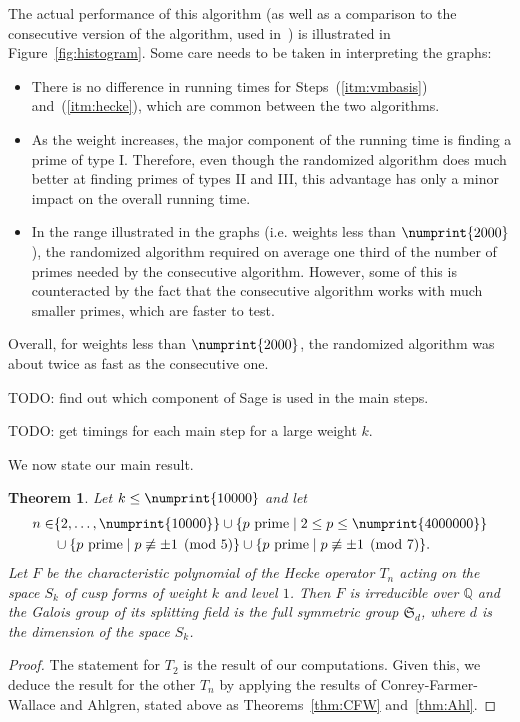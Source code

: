 \documentclass[11pt]{article}
\theoremstyle{plain}
\newtheorem{theorem}{Theorem}[section]
\theoremstyle{definition}
\theoremstyle{remark}
\numberwithin{equation}{section}
\newcommand{\QQ}{\mathbb{Q}}
\renewcommand{\SS}{\mathfrak{S}}
\newcommand{\bound}{\numprint{10000}}
\begin{document}
The actual performance of this algorithm (as well as a comparison to the
consecutive version of the algorithm, used in~\cite{ConreyFarmer}) is
illustrated in Figure~\ref{fig:histogram}.  Some care needs to be taken in
interpreting the graphs:
\begin{itemize}
  \item There is no difference in running times for Steps~(\ref{itm:vmbasis}) 
    and~(\ref{itm:hecke}), which 
    are common between the two algorithms.
  \item As the weight increases, the major component of the running time is
    finding a prime of type I.  Therefore, even though the randomized
    algorithm does much better at finding primes of types II and III, this
    advantage has only a minor impact on the overall running time.
  \item In the range illustrated in the graphs (i.e. weights less than
    $\numprint{2000}$), the randomized algorithm required on average one third
    of the number of primes needed by the consecutive algorithm.  However,
    some of this is counteracted by the fact that the consecutive algorithm
    works with much smaller primes, which are faster to test.
\end{itemize}

Overall, for weights less than $\numprint{2000}$, the randomized algorithm was
about twice as fast as the consecutive one.  

TODO: find out which component of Sage is used in the main steps.

TODO: get timings for each main step for a large weight $k$.



We now state our main result.

\begin{theorem}\label{thm:main}
  Let $k\leq \bound$ and let
  \begin{align*}
    n\in &\{2,\ldots,\numprint{10000}\}\cup
    \{p\text{ prime}\mid 2\leq p\leq\numprint{4000000}\}\\
    &\cup\{p\text{ prime}\mid p\not\equiv\pm 1\pmod{5}\}\cup
    \{p\text{ prime}\mid p\not\equiv\pm 1\pmod{7}\}.
  \end{align*}
  Let $F$ be the characteristic polynomial of the
  Hecke operator $T_n$ acting on the space $S_k$ of cusp forms of weight
  $k$ and level $1$.  Then $F$ is irreducible over $\QQ$ and the Galois
  group of its splitting field is the full symmetric group $\SS_d$, 
  where $d$ is the dimension of the space $S_k$.
\end{theorem}
\begin{proof}
  The statement for $T_2$ is the result of our computations.  Given this, we
  deduce the result for the other $T_n$ by applying the results of
  Conrey-Farmer-Wallace and Ahlgren, stated above as Theorems~\ref{thm:CFW}
  and~\ref{thm:Ahl}.
\end{proof}
\end{document}
